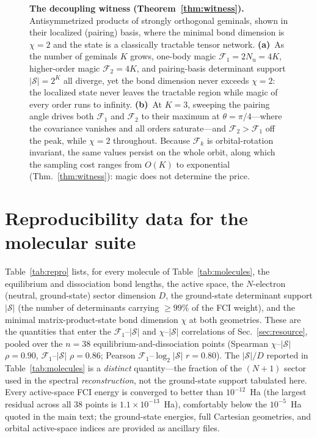 \begin{figure}[htbp]\centering
\caption{\textbf{The decoupling witness (Theorem~\ref{thm:witness}).} Antisymmetrized products of
strongly orthogonal geminals, shown in their localized (pairing) basis, where the minimal bond dimension
is $\chi=2$ and the state is a classically tractable tensor network. \textbf{(a)}~As the number of
geminals $K$ grows, one-body magic $\mathcal F_1=2N_{\mathrm u}=4K$, higher-order magic
$\mathcal F_2=4K$, and pairing-basis determinant support $|\mathcal S|=2^{K}$ all diverge, yet the bond
dimension never exceeds $\chi=2$: the localized state never leaves the tractable region while magic of every
order runs to infinity. \textbf{(b)}~At $K=3$, sweeping the pairing angle drives both $\mathcal F_1$ and
$\mathcal F_2$ to their maximum at $\theta=\pi/4$---where the covariance vanishes and all orders
saturate---and $\mathcal F_2>\mathcal F_1$ off the peak, while $\chi=2$ throughout. Because
$\mathcal F_k$ is orbital-rotation invariant, the same values persist on the whole orbit, along which the
sampling cost ranges from $O(K)$ to exponential (Thm.~\ref{thm:witness}): magic does not determine the
price.}\label{fig:witness}\end{figure}

\FloatBarrier  %
\section{Reproducibility data for the molecular suite}
\label{app:repro}
Table~\ref{tab:repro} lists, for every molecule of Table~\ref{tab:molecules}, the equilibrium and
dissociation bond lengths, the active space, the $N$-electron (neutral, ground-state) sector dimension $D$, the ground-state
determinant support $|\mathcal S|$ (the number of determinants carrying $\ge99\%$ of the FCI weight), and
the minimal matrix-product-state bond dimension $\chi$ at both geometries. These are the quantities that
enter the $\mathcal F_1$--$|\mathcal S|$ and $\chi$--$|\mathcal S|$ correlations of
Sec.~\ref{sec:resource}, pooled over the $n=38$ equilibrium-and-dissociation points (Spearman
$\chi$--$|\mathcal S|$ $\rho=0.90$, $\mathcal F_1$--$|\mathcal S|$ $\rho=0.86$; Pearson
$\mathcal F_1$--$\log_2|\mathcal S|$ $r=0.80$). The $|\mathcal S|/D$ reported in
Table~\ref{tab:molecules} is a \emph{distinct} quantity---the fraction of the $(N{+}1)$ sector used in
the spectral \emph{reconstruction}, not the ground-state support tabulated here. Every active-space FCI
energy is converged to better than $10^{-12}$~Ha (the largest residual across all $38$ points is
$1.1\times10^{-13}$~Ha), comfortably below the $10^{-5}$~Ha quoted in the main text; the ground-state
energies, full Cartesian geometries, and orbital active-space indices are provided as ancillary files.

